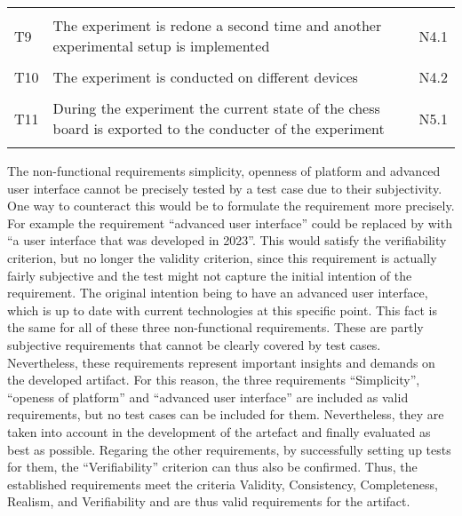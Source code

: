\begin{table}[htbp]
\begin{tabular}{L{0.04\textwidth}L{0.7\textwidth}L{0.15\textwidth}}
    & \\
    T9  & The experiment is redone a second time and another experimental setup is implemented                                                     & N4.1                         \\
    & \\
    T10 & The experiment is conducted on different devices                                                                                         & N4.2                         \\
    & \\
    T11 & During the experiment the current state of the chess board is exported to the conducter of the experiment                                & N5.1                         \\ 
    & \\ \hline
    \end{tabular}
    \end{table}

The non-functional requirements simplicity, openness of platform and advanced user interface cannot be precisely tested by a test case due to their subjectivity. One way to counteract this would be to formulate the requirement more precisely. For example the requirement \enquote{advanced user interface} could be replaced by with \enquote{a user interface that was developed in 2023}. This would satisfy the verifiability criterion, but no longer the validity criterion, since this requirement is actually fairly subjective and the test might not capture the initial intention of the requirement. The original intention being to have an advanced user interface, which is up to date with current technologies at this specific point. This fact is the same for all of these three non-functional requirements. These are partly subjective requirements that cannot be clearly covered by test cases. Nevertheless, these requirements represent important insights and demands on the developed artifact. For this reason, the three requirements \enquote{Simplicity}, \enquote{openess of platform} and \enquote{advanced user interface} are included as valid requirements, but no test cases can be included for them. Nevertheless, they are taken into account in the development of the artefact and finally evaluated as best as possible. Regaring the other requirements, by successfully setting up tests for them, the \enquote{Verifiability} criterion can thus also be confirmed. Thus, the established requirements meet the criteria Validity, Consistency, Completeness, Realism, and Verifiability and are thus valid requirements for the artifact.
